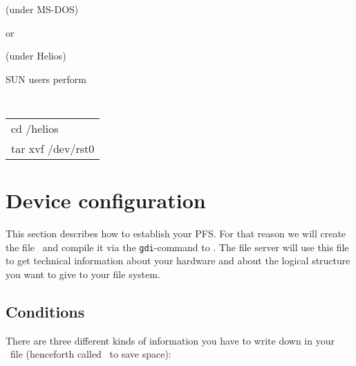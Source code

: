  \hfill (under MS-DOS)

or

 \hfill (under Helios)

SUN users perform

{\tt
  \begin{tabular}{|l|}
    \hline
    cd /helios        \\
    tar xvf /dev/rst0 \\
    \hline
  \end{tabular}
}

\section{Device configuration} \label{sec:di}

This section describes how to establish your PFS. For that reason we will
create the file \HEDIS\ and compile it via the {\tt gdi}-command to \HEDI. 
The file server will use this file to get technical information about your 
hardware and about the logical structure you want to give to your file system.

\begin{note}


\end{note}

\subsection{Conditions}

There are three different kinds of information you have to write down in your
\HEDIS\ file (henceforth called \DI\ to save space):

